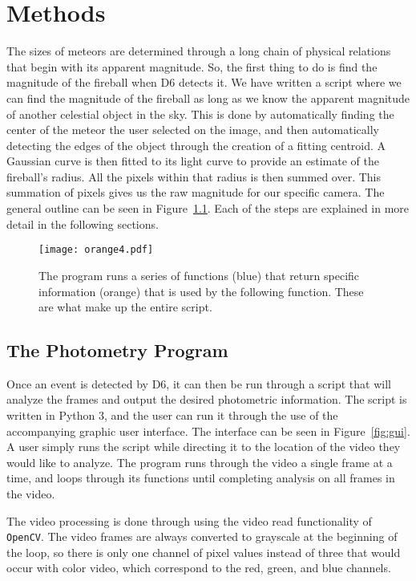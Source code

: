 \chapter{Methods}

The sizes of meteors are determined through a long chain of physical relations that begin with its apparent magnitude. So, the first thing to do is find the magnitude of the fireball when D6 detects it. We have written a script where we can find the magnitude of the fireball as long as we know the apparent magnitude of another celestial object in the sky. This is done by automatically finding the center of the meteor the user selected on the image, and then automatically detecting the edges of the  object through the creation of a fitting centroid. A Gaussian curve is then fitted to its light curve to provide an estimate of the fireball's radius. All the pixels within that radius is then summed over. This summation of pixels gives us the raw magnitude for our specific camera. The general outline can be seen in Figure~\ref{fig:flowchart}. Each of the steps are explained in more detail in the following sections.

\begin{figure}[htpb]
	\centering
	\texttt{[image: orange4.pdf]}
	\caption{The program runs a series of functions (blue) that return specific information (orange) that is used by the following function. These are what make up the entire script.}
	\label{fig:flowchart}
\end{figure}

\section{The Photometry Program}

Once an event is detected by D6, it can then be run through a script that will analyze the frames and output the desired photometric information. The script is written in Python 3, and the user can run it through the use of the accompanying graphic user interface. The interface can be seen in Figure~\ref{fig:gui}. A user simply runs the script while directing it to the location of the video they would like to analyze. The program runs through the video a single frame at a time, and loops through its functions until completing analysis on all frames in the video.

The video processing is done through using the video read functionality of \texttt{OpenCV}. The video frames are always converted to grayscale at the beginning of the loop, so there is only one channel of pixel values instead of three that would occur with color video, which correspond to the red, green, and blue channels.

